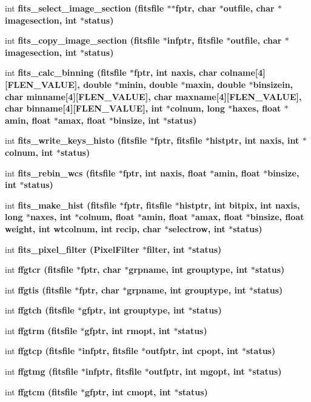 \begin{CompactItemize}
\item 
int \bf{fits\_\-select\_\-image\_\-section} (\bf{fitsfile} $\ast$$\ast$fptr, char $\ast$outfile, char $\ast$imagesection, int $\ast$status)
\item 
int \bf{fits\_\-copy\_\-image\_\-section} (\bf{fitsfile} $\ast$infptr, \bf{fitsfile} $\ast$outfile, char $\ast$imagesection, int $\ast$status)
\item 
int \bf{fits\_\-calc\_\-binning} (\bf{fitsfile} $\ast$fptr, int naxis, char colname[4][FLEN\_\-VALUE], double $\ast$minin, double $\ast$maxin, double $\ast$binsizein, char minname[4][FLEN\_\-VALUE], char maxname[4][FLEN\_\-VALUE], char binname[4][FLEN\_\-VALUE], int $\ast$colnum, long $\ast$haxes, float $\ast$amin, float $\ast$amax, float $\ast$binsize, int $\ast$status)
\item 
int \bf{fits\_\-write\_\-keys\_\-histo} (\bf{fitsfile} $\ast$fptr, \bf{fitsfile} $\ast$histptr, int naxis, int $\ast$colnum, int $\ast$status)
\item 
int \bf{fits\_\-rebin\_\-wcs} (\bf{fitsfile} $\ast$fptr, int naxis, float $\ast$amin, float $\ast$binsize, int $\ast$status)
\item 
int \bf{fits\_\-make\_\-hist} (\bf{fitsfile} $\ast$fptr, \bf{fitsfile} $\ast$histptr, int bitpix, int naxis, long $\ast$naxes, int $\ast$colnum, float $\ast$amin, float $\ast$amax, float $\ast$binsize, float weight, int wtcolnum, int recip, char $\ast$selectrow, int $\ast$status)
\item 
int \bf{fits\_\-pixel\_\-filter} (\bf{Pixel\-Filter} $\ast$filter, int $\ast$status)
\item 
int \bf{ffgtcr} (\bf{fitsfile} $\ast$fptr, char $\ast$grpname, int grouptype, int $\ast$status)
\item 
int \bf{ffgtis} (\bf{fitsfile} $\ast$fptr, char $\ast$grpname, int grouptype, int $\ast$status)
\item 
int \bf{ffgtch} (\bf{fitsfile} $\ast$gfptr, int grouptype, int $\ast$status)
\item 
int \bf{ffgtrm} (\bf{fitsfile} $\ast$gfptr, int rmopt, int $\ast$status)
\item 
int \bf{ffgtcp} (\bf{fitsfile} $\ast$infptr, \bf{fitsfile} $\ast$outfptr, int cpopt, int $\ast$status)
\item 
int \bf{ffgtmg} (\bf{fitsfile} $\ast$infptr, \bf{fitsfile} $\ast$outfptr, int mgopt, int $\ast$status)
\item 
int \bf{ffgtcm} (\bf{fitsfile} $\ast$gfptr, int cmopt, int $\ast$status)
\item 
$$
\end{CompactItemize}
